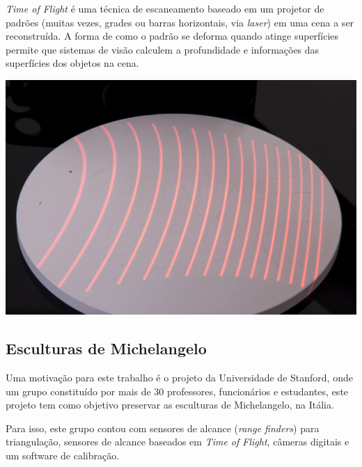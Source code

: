 \documentclass[table, usenames, svgnames, xcolor=dvipsnames]{beamer}
\begin{document}
\begin{frame}
	\begin{center}
		\emph{Time of Flight} é uma técnica de escaneamento baseado em um projetor de padrões (muitas vezes, grades ou barras horizontais, via \emph{laser}) em uma cena a ser reconstruída. A forma de como o padrão se deforma quando atinge superfícies permite que sistemas de visão calculem a profundidade e informações das superfícies dos objetos na cena.
	\end{center}
\end{frame}

\begin{frame} 
	\begin{center}
		\centering
		\includegraphics[width=0.7\linewidth]{figs/luzestruturada.jpg}
	\end{center}
\end{frame}

\subsection{Esculturas de Michelangelo}

\begin{frame} 
	\begin{center}
		Uma motivação para este trabalho é o projeto da Universidade de Stanford, onde um grupo constituído por mais de 30 professores, funcionários e estudantes, este projeto tem como objetivo preservar as esculturas de Michelangelo, na Itália.
	\end{center}
\end{frame}

\begin{frame} 
	\begin{center}
		Para isso, este grupo contou com sensores de alcance (\emph{range finders}) para triangulação, sensores de alcance baseados em \emph{Time of Flight}, câmeras digitais e um software de calibração.
	\end{center}
\end{frame}
\end{document}
